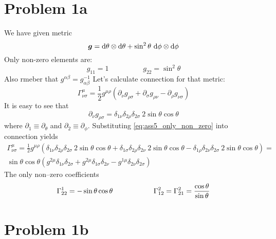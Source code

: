 
\section*{Problem 1a}

We have given metric
%
\begin{equation}
    \boldsymbol{g} = \dd\theta \otimes \dd\theta + \sin^2\theta~\dd\phi \otimes \dd\phi
\end{equation}
%
Only non-zero elements are:
%
\begin{equation}
    g_{11} = 1 \hspace{2cm} g_{22} = \sin^2\theta
\end{equation}
%
Also rmeber that $g^{\alpha\beta} = g_{\alpha\beta}^{-1}$ Let's calculate
connection for that metric:
%
\begin{equation}
    \Gamma^\mu_{\nu\sigma} =
    \frac{1}{2} g^{\mu\rho} \left(
    \partial_\nu g_{\rho\sigma} +
    \partial_\sigma g_{\rho\nu} -
    \partial_\rho g_{\nu\sigma}\right)
\end{equation}
%
It is easy to see that
%
\begin{equation}
    \partial_\nu g_{\rho\sigma} =
    \delta_{1\nu}\delta_{2\rho}\delta_{2\sigma}~2\sin\theta\cos\theta
    \label{eq:ass5_only_non_zero}
\end{equation}
%
where $\partial_1 \equiv \partial_\theta$ and $\partial_2 \equiv \partial_\phi$.
Substituting \cref{eq:ass5_only_non_zero} into connection yields
%
\begin{multline}
    \Gamma^\mu_{\nu\sigma} =
    \frac{1}{2} g^{\mu\rho} \left(
    \delta_{1\nu}\delta_{2\rho}\delta_{2\sigma}~2\sin\theta\cos\theta +
    \delta_{1\sigma}\delta_{2\rho}\delta_{2\nu}~2\sin\theta\cos\theta-
    \delta_{1\rho}\delta_{2\nu}\delta_{2\sigma}~2\sin\theta\cos\theta\right) =\\
    \sin\theta\cos\theta\left(
    g^{2\mu} \delta_{1\nu}\delta_{2\sigma} +
    g^{2\mu} \delta_{1\sigma}\delta_{2\nu} -
    g^{1\mu}\delta_{2\nu}\delta_{2\sigma}\right)
\end{multline}
%
The only non--zero coefficients
%
\begin{equation}
    \Gamma^1_{22} = -\sin\theta\cos\theta
    \hspace*{2cm}
    \Gamma^2_{12} = \Gamma^2_{21} = \frac{\cos\theta}{\sin\theta}
    \label{eq:ass5_coeff}
\end{equation}

\section*{Problem 1b}

